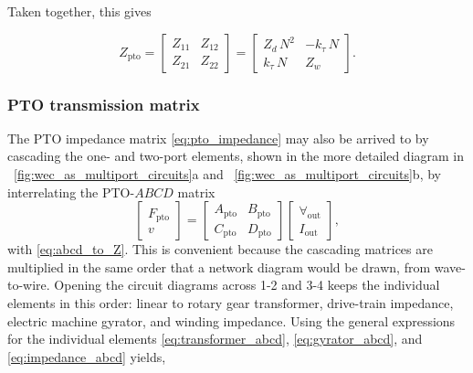 \documentclass[lettersize,journal]{IEEEtran}
\begin{document}
\noindent{}Taken together, this gives 

 \begin{equation}
        Z_{\textrm{pto}} 
        = 
        \begin{bmatrix} 
                Z_{11} & Z_{12} \\ 
                Z_{21} & Z_{22} 
        \end{bmatrix}
        =
        \begin{bmatrix} 
        Z_d \, N^2      & -k_\tau \, N  \\
        k_\tau \, N     & Z_w
        \end{bmatrix}.
        \label{eq:pto_impedance}
 \end{equation}

\subsubsection{PTO transmission matrix}\label{sec:pto_transmission_matrix}
 The PTO impedance matrix \eqref{eq:pto_impedance} may also be arrived to by cascading the one- and two-port elements, shown in the more detailed diagram in \figurename~\ref{fig:wec_as_multiport_circuits}a and \figurename~\ref{fig:wec_as_multiport_circuits}b, by interrelating the PTO-$ABCD$ matrix
 \begin{equation}
 	\label{eq:pto_ABCD_mat_def}
 	\begin{bmatrix} 
 		F_{\textrm{pto}} \\
 		v 
 	\end{bmatrix} 
 	= 
	\begin{bmatrix} 
		A_{\textrm{pto}} & B_{\textrm{pto}} \\ 
		C_{\textrm{pto}} & D_{\textrm{pto}} 
	\end{bmatrix}
 	\begin{bmatrix} 
 		\forall_{\textrm{out}} \\
 		I_{\textrm{out}} 
 	\end{bmatrix},
 \end{equation}
 \noindent{}with \eqref{eq:abcd_to_Z}.
 This is convenient because the cascading matrices are multiplied in the same order that a network diagram would be drawn, from wave-to-wire.
 Opening the circuit diagrams across 1-2 and 3-4 keeps the individual elements in this order: linear to rotary gear transformer, drive-train impedance, electric machine gyrator, and winding impedance. Using the general expressions for the individual elements \eqref{eq:transformer_abcd}, \eqref{eq:gyrator_abcd}, and \eqref{eq:impedance_abcd} yields, 
\end{document}
